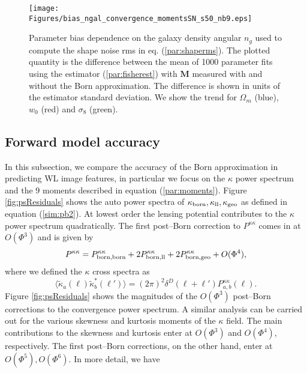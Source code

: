 \documentclass[reprint,aps,prd,superscriptaddress,showkeys,showpacs]{revtex4-1}
\newcommand{\bb}[1]{\mathbf{#1}}
\begin{document}
\begin{figure}
\begin{center}
\texttt{[image: Figures/bias\_ngal\_convergence\_momentsSN\_s50\_nb9.eps]}
\end{center}
\caption{Parameter bias dependence on the galaxy density angular $n_g$ used to compute the shape noise rms in eq. (\ref{par:shaperms}). The plotted quantity is the difference between the mean of 1000 parameter fits using the estimator (\ref{par:fisherest}) with $\bb{M}$ measured with and without the Born approximation. The difference is shown in units of the estimator standard deviation. We show the trend for $\Omega_m$ (blue), $w_0$ (red) and $\sigma_8$ (green).}
\label{fig:parbiasSN}
\end{figure}

\subsection{Forward model accuracy}

In this subsection, we compare the accuracy of the Born approximation in predicting WL image features, in particular we focus on the $\kappa$ power spectrum and the 9 moments described in equation (\ref{par:moments}). Figure \ref{fig:psResiduals} shows the auto power spectra of $\kappa_{\rm born},\kappa_{\rm ll},\kappa_{\rm geo}$ as defined in equation (\ref{sim:pb2}). At lowest order the lensing potential contributes to the $\kappa$ power spectrum quadratically. The first post--Born correction to $P^{\kappa\kappa}$ comes in at $O(\Phi^3)$ and is given by
\begin{equation}
\label{res:powercorr}
P^{\kappa\kappa} = P^{\kappa\kappa}_{\rm born,born} + 2P^{\kappa\kappa}_{\rm born,ll} + 2P^{\kappa\kappa}_{\rm born,geo} + O(\Phi^4),
\end{equation}
%
where we defined the $\kappa$ cross spectra as
\begin{equation}
\label{res:powercross}
\langle\tilde{\kappa}_a(\pmb{\ell})\tilde{\kappa}_b^*(\pmb{\ell}')\rangle = (2\pi)^2\delta^D(\pmb{\ell}+\pmb{\ell}')P_{a,b}^{\kappa\kappa}(\ell).
\end{equation} 
%
Figure \ref{fig:psResiduals} shows the magnitudes of the $O(\Phi^3)$ post--Born corrections to the convergence power spectrum. A similar analysis can be carried out for the various skewness and kurtosis moments of the $\kappa$ field. The main contributions to the skewness and kurtosis enter at $O(\Phi^3)$ and $O(\Phi^4)$, respectively. The first post--Born corrections, on the other hand, enter at $O(\Phi^5),O(\Phi^6)$. In more detail, we have
\end{document}
